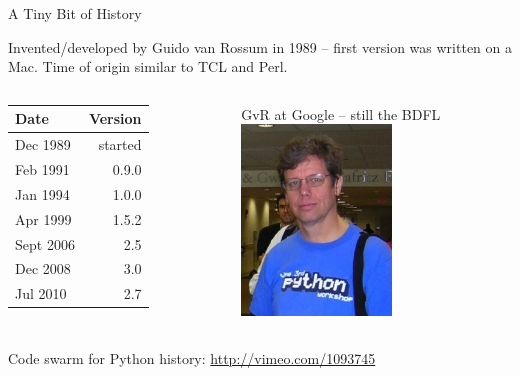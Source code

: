 \documentclass{beamer}
\begin{document}
\begin{frame}{A Tiny Bit of History}

Invented/developed by Guido van Rossum in 1989 -- first version was written on
a Mac. Time of origin similar to TCL and Perl.

   \begin{columns}[t] %
     \begin{column}[T]{4.5cm} %
        \begin{tabular}[pos]{lr}
             Date   	&  Version \\
            \hline
            Dec 1989   	& started \\
            Feb 1991        &	0.9.0 \\
            Jan 1994         &    1.0.0 \\
            Apr 1999		  &   1.5.2 \\	
            Sept 2006	  &   2.5 \\
            Dec 2008	  &   	3.0 \\
            Jul 2010            	  &    2.7 \\
        \end{tabular}
     \end{column}
     \begin{column}[T]{5.5cm} %
          GvR at Google -- still the BDFL \\
          \includegraphics[height=2.0in]{GvR.jpg}
     \end{column}
   \end{columns}
Code swarm for Python history: \url{http://vimeo.com/1093745}

\end{frame} 
\end{document}
